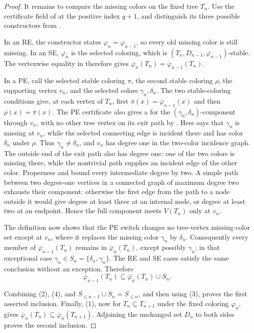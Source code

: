 \begin{proof}
It remains to compare the missing colors on the fixed tree \(T_n\).
Use the certificate field of  at the positive
index \(q+1\), and distinguish its three possible constructors from
.

In an RE, the constructor states
\(\varphi_n=\varphi_{n-1}\), so every old missing color is still missing.
In an SE, \(\varphi_n\) is the selected coloring, which is
\((T_n,D_{n-1},\varphi_{n-1})\)-stable.  The vertexwise equality in
 therefore gives
\(\overline\varphi_n(T_n)=\overline\varphi_{n-1}(T_n)\).

In a PE, call the selected stable coloring \(\pi\), the second stable
coloring \(\rho\), the supporting vertex \(v_n\), and the selected colors
\(\gamma_n,\delta_n\).  The two stable-coloring conditions give, at each
vertex of \(T_n\), first
\(\overline\pi(x)=\overline\varphi_{n-1}(x)\) and then
\(\overline\rho(x)=\overline\pi(x)\).  The PE certificate also gives a
 for the \((\gamma_n,\delta_n)\)-component through
\(v_n\), with no other tree vertex on its exit path by
.  Here  says that
\(\gamma_n\) is missing at \(v_n\), while the selected connecting edge is
incident there and has color \(\delta_n\) under \(\rho\).  Thus
\(\gamma_n\ne\delta_n\), and \(v_n\) has degree one in the two-color
incidence graph.  The outside end of the exit path also has degree one:
one of the two colors is missing there, while the nontrivial path supplies
an incident edge of the other color.  Properness and
 bound every intermediate degree
by two.  A simple path between two degree-one vertices in a connected
graph of maximum degree two exhausts their component: otherwise the first
edge from the path to a node outside it would give degree at least three at
an internal node, or degree at least two at an endpoint.  Hence the full
component meets \(V(T_n)\) only at \(v_n\).

The definition  now shows that the PE
switch changes no tree-vertex missing-color set except at \(v_n\), where
it replaces the missing color \(\gamma_n\) by \(\delta_n\).  Consequently
every member of \(\overline\varphi_{n-1}(T_n)\) remains in
\(\overline\varphi_n(T_n)\), except possibly \(\gamma_n\); in that
exceptional case \(\gamma_n\in S_n=\{\delta_n,\gamma_n\}\).  The RE and
SE cases satisfy the same conclusion without an exception.  Therefore
\[
 \overline\varphi_{n-1}(T_n)
 \subseteq\overline\varphi_n(T_n)\cup S_n.                       \tag{4}
\]

Combining (2), (4), and
\(S_{\leq n-1}\cup S_n=S_{\leq n}\), and then using (3), proves the
first asserted inclusion.  Finally, (1), now for \(T_n\subseteq T_{n+1}\)
under the fixed coloring \(\varphi_n\), gives
\(\overline\varphi_n(T_n)\subseteq\overline\varphi_n(T_{n+1})\).
Adjoining the unchanged set \(D_n\) to both sides proves the second
inclusion.
\end{proof}
